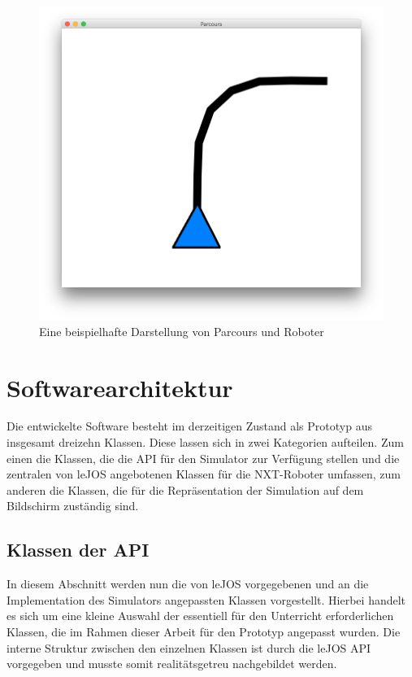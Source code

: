 \documentclass[paper=a4, pagesize, DIV=calc, BCOR=15.5mm, twoside=on, onecolumn=on, open = right, titlepage =on, parskip =half-, headsepline = on, footsepline = on, chapterprefix = on, appendixprefix = off, fontsize = 12pt, numbers = noenddot, abstract = on]{scrbook}
\numberwithin{equation}{chapter}
\theoremstyle{definition}
\theoremstyle{plain}
\theoremstyle{plain}
\theoremstyle{remark}
\theoremstyle{plain}
\theoremstyle{plain}
\begin{document}
\begin{figure}[H]
\centering
\includegraphics[scale=0.45]{images/simparcours_kurve.png} 
\caption{Eine beispielhafte Darstellung von Parcours und Roboter}
\label{fig:simparcours_kurve}
\end{figure}


\par \singlespacing
\section{Softwarearchitektur}
\onehalfspacing 
Die entwickelte Software besteht im derzeitigen Zustand als Prototyp aus insgesamt dreizehn Klassen. Diese lassen sich in zwei Kategorien aufteilen. Zum einen die Klassen, die die API für den Simulator zur Verfügung stellen und die zentralen von leJOS angebotenen Klassen für die NXT-Roboter umfassen, zum anderen die Klassen, die für die Repräsentation der Simulation auf dem Bildschirm zuständig sind.

\par \singlespacing
\subsection{Klassen der API}
\label{sec:API}
\onehalfspacing
In diesem Abschnitt werden nun die von leJOS vorgegebenen und an die Implementation des Simulators angepassten Klassen vorgestellt. Hierbei handelt es sich um eine kleine Auswahl der essentiell für den Unterricht erforderlichen Klassen, die im Rahmen dieser Arbeit für den Prototyp angepasst wurden. Die interne Struktur zwischen den einzelnen Klassen ist durch die leJOS API vorgegeben und musste somit realitätsgetreu nachgebildet werden.
\end{document}
